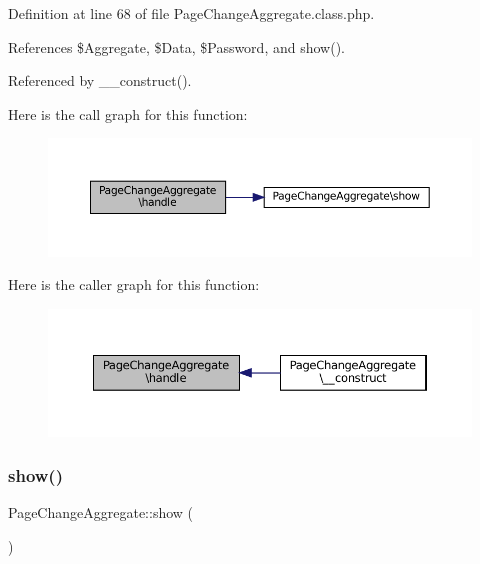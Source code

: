 Definition at line 68 of file Page\+Change\+Aggregate.\+class.\+php.



References \$\+Aggregate, \$\+Data, \$\+Password, and show().



Referenced by \+\_\+\+\_\+construct().

Here is the call graph for this function\+:\nopagebreak
\begin{figure}[H]
\begin{center}
\leavevmode
\includegraphics[width=350pt]{class_page_change_aggregate_a9aa7ddde1d298c61ecca29c42f99a4c7_cgraph}
\end{center}
\end{figure}
Here is the caller graph for this function\+:\nopagebreak
\begin{figure}[H]
\begin{center}
\leavevmode
\includegraphics[width=350pt]{class_page_change_aggregate_a9aa7ddde1d298c61ecca29c42f99a4c7_icgraph}
\end{center}
\end{figure}
\mbox{\label{class_page_change_aggregate_ace6ee8ccecde93fa027574965d32b471}} 
\subsubsection{\texorpdfstring{show()}{show()}}
{\footnotesize\ttfamily Page\+Change\+Aggregate\+::show (\begin{DoxyParamCaption}{ }\end{DoxyParamCaption})\hspace{0.3cm}{\ttfamily [protected]}}

